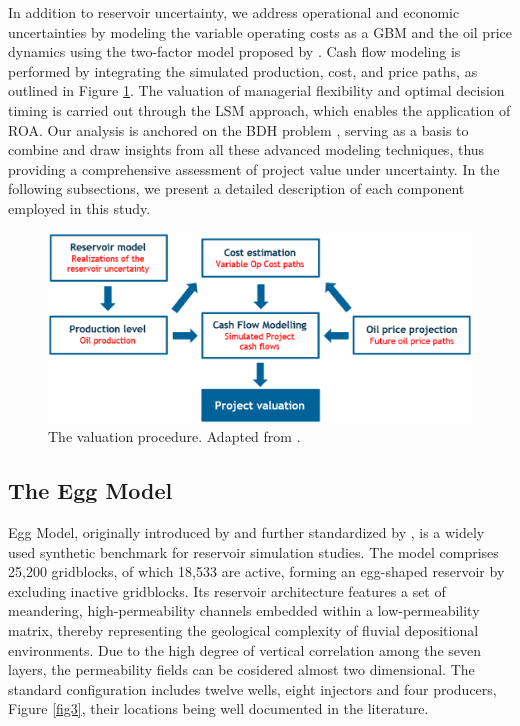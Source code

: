 \documentclass[pdflatex,sn-basic]{sn-jnl}%
\theoremstyle{thmstyleone}%
\theoremstyle{thmstyletwo}%
\theoremstyle{thmstylethree}%
\begin{document}
In addition to reservoir uncertainty, we address operational and economic uncertainties by modeling the variable operating costs as a GBM and the oil price dynamics using the two-factor model proposed by \cite{ref17}. Cash flow modeling is performed by integrating the simulated production, cost, and price paths, as outlined in Figure \ref{fig2}. The valuation of managerial flexibility and optimal decision timing is carried out through the LSM approach, which enables the application of ROA. Our analysis is anchored on the BDH problem \citep{ref12a}, serving as a basis to combine and draw insights from all these advanced modeling techniques, thus providing a comprehensive assessment of project value under uncertainty. In the following subsections, we present a detailed description of each component employed in this study.

\begin{figure}[H]
\centering
\begin{minipage}{0.95\textwidth}
  \includegraphics[width=\textwidth]{valuation.eps}
  \caption{The valuation procedure. Adapted from \cite{ref22}.}
  \label{fig2}
\end{minipage}
\end{figure}

\subsection{The Egg Model}\label{subsec41}

Egg Model, originally introduced by \cite{ref23} and further standardized by \cite{ref18}, is a widely used synthetic benchmark for reservoir simulation studies. The model comprises 25,200 gridblocks, of which 18,533 are active, forming an egg-shaped reservoir by excluding inactive gridblocks. Its reservoir architecture features a set of meandering, high-permeability channels embedded within a low-permeability matrix, thereby representing the geological complexity of fluvial depositional environments. Due to the high degree of vertical correlation among the seven layers, the permeability fields can be cosidered almost two dimensional. The standard configuration includes twelve wells, eight injectors and four producers, Figure \ref{fig3}, their locations being well documented in the literature.
\end{document}
